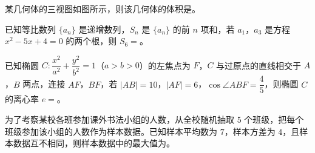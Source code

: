 \Needspace{0.4\textheight}
\begin{question}
某几何体的三视图如图所示，则该几何体的体积是\gkblank{}。
\nopagebreak[4]
\begin{center}\end{center}
\nopagebreak[4]
\end{question}
\begin{question}
已知等比数列 $\{a_n\}$ 是递增数列，$S_n$ 是 $\{a_n\}$ 的前 $n$ 项和，若 $a_1$，$a_3$ 是方程 $x^2-5x+4=0$ 的两个根，则 $S_6=$\gkblank{}。

\end{question}
\begin{question}
已知椭圆 $C:\dfrac{x^2}{a^2}+\dfrac{y^2}{b^2}=1$（$a>b>0$）的左焦点为 $F$，$C$ 与过原点的直线相交于 $A$，$B$ 两点，连接 $AF$，$BF$，若 $|AB|=10$，$|AF|=6$，$\cos\angle ABF=\dfrac45$，则椭圆 $C$ 的离心率 $e=$\gkblank{}。

\end{question}
\begin{question}
为了考察某校各班参加课外书法小组的人数，从全校随机抽取 $5$ 个班级，把每个班级参加该小组的人数作为样本数据。已知样本平均数为 $7$，样本方差为 $4$，且样本数据互不相同，则样本数据中的最大值为\gkblank{}。

\end{question}

